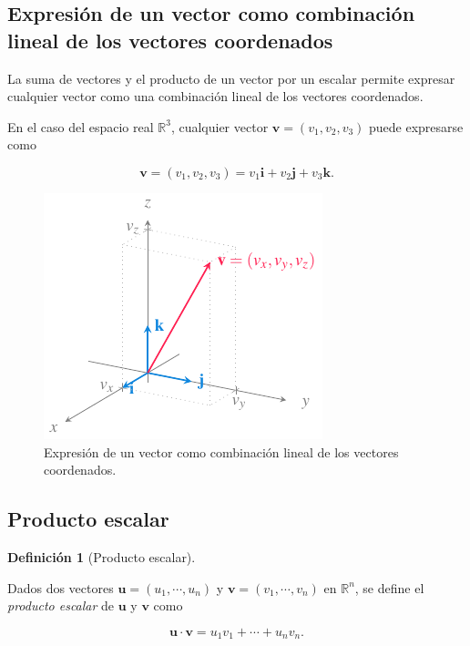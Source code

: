 \documentclass[
  a4paper,
]{scrreport}
\theoremstyle{definition}
\theoremstyle{plain}
\theoremstyle{plain}
\theoremstyle{plain}
\theoremstyle{definition}
\newtheorem{definition}{Definición}[chapter]
\theoremstyle{remark}
\begin{document}
\hypertarget{expresiuxf3n-de-un-vector-como-combinaciuxf3n-lineal-de-los-vectores-coordenados}{%
\subsection{Expresión de un vector como combinación lineal de los
vectores
coordenados}\label{expresiuxf3n-de-un-vector-como-combinaciuxf3n-lineal-de-los-vectores-coordenados}}

La suma de vectores y el producto de un vector por un escalar permite
expresar cualquier vector como una combinación lineal de los vectores
coordenados.

En el caso del espacio real \(\mathbb{R}^3\), cualquier vector
\(\mathbf{v}=(v_1,v_2,v_3)\) puede expresarse como

\[\mathbf{v}=(v_1,v_2,v_3) = v_1\mathbf{i}+v_2\mathbf{j}+v_3\mathbf{k}.\]

\begin{figure}

{\centering \includegraphics{img/geometria-plano-espacio/combinacion-lineal-vectores-coordenados.pdf}

}

\caption{Expresión de un vector como combinación lineal de los vectores
coordenados.}

\end{figure}

\hypertarget{producto-escalar}{%
\subsection{Producto escalar}\label{producto-escalar}}

\begin{definition}[Producto
escalar]\protect\hypertarget{def-producto-escalar}{}\label{def-producto-escalar}

Dados dos vectores \(\mathbf{u}=(u_1,\cdots,u_n)\) y
\(\mathbf{v}=(v_1,\cdots,v_n)\) en \(\mathbb{R}^n\), se define el
\emph{producto escalar} de \(\mathbf{u}\) y \(\mathbf{v}\) como

\[
\mathbf{u}\cdot \mathbf{v} = u_1v_1 + \cdots + u_nv_n.
\]

\end{definition}
\end{document}
